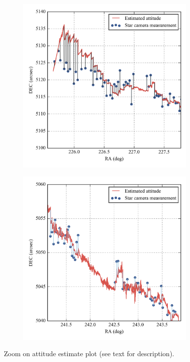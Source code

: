 \begin{figure}[!h]
\begin{subfigure}[b]{0.5\textwidth}
		\centering
		\includegraphics[width=0.98\textwidth]{Figures/attitude_estimate_zoom1.png} 
		\caption{}
		\label{subfig:attitudeEstimateZoom1}
\end{subfigure}
\begin{subfigure}[b]{0.5\textwidth}
		\centering
		\includegraphics[width=0.98\textwidth]{Figures/attitude_estimate_zoom2.png} 
		\caption{}
		\label{subfig:attitudeEstimateZoom2}
\end{subfigure}
\caption[Zoom on attitude estimate plot]{Zoom on attitude estimate plot (see text for description).}
\label{fig:AttitudeEstimateZoom}
\end{figure}

